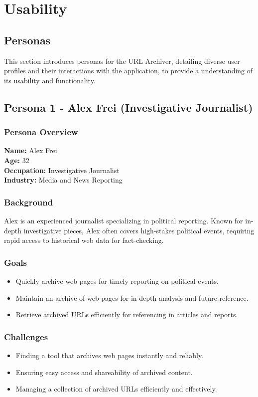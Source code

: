 \section{Usability}

\subsection{Personas}
This section introduces personas for the URL Archiver, detailing diverse user profiles and their interactions with the application, to provide a understanding of its usability and functionality.

\subsection{Persona 1 - Alex Frei (Investigative Journalist)}

\subsubsection{Persona Overview}

\textbf{Name:} Alex Frei \\
\textbf{Age:} 32 \\
\textbf{Occupation:} Investigative Journalist \\
\textbf{Industry:} Media and News Reporting

\subsubsection{Background}
Alex is an experienced journalist specializing in political reporting.
Known for in-depth investigative pieces, Alex often covers high-stakes political events, requiring rapid access to historical web data for fact-checking.

\subsubsection{Goals}
\begin{itemize}
    \item Quickly archive web pages for timely reporting on political events.
    \item Maintain an archive of web pages for in-depth analysis and future reference.
    \item Retrieve archived URLs efficiently for referencing in articles and reports.
\end{itemize}

\subsubsection{Challenges}
\begin{itemize}
    \item Finding a tool that archives web pages instantly and reliably.
    \item Ensuring easy access and shareability of archived content.
    \item Managing a collection of archived URLs efficiently and effectively.
\end{itemize}

